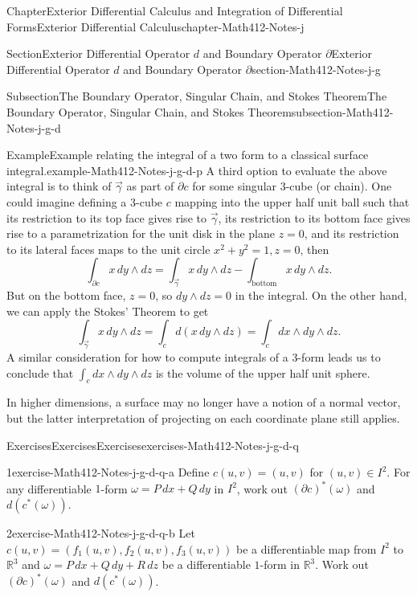 \documentclass[oneside,10pt,]{book}
\numberwithin{equation}{section}
\newcommand{\bbR}{\mathbb{R}}
\newcommand{\vg}{{\vec{\gamma}}}
\begin{document}
\begin{chapterptx}{Chapter}{Exterior Differential Calculus and Integration of Differential Forms}{}{Exterior Differential Calculus}{}{}{chapter-Math412-Notes-j}
\begin{sectionptx}{Section}{Exterior Differential Operator \(d\) and Boundary Operator \(\partial\)}{}{Exterior Differential Operator \(d\) and Boundary Operator \(\partial\)}{}{}{section-Math412-Notes-j-g}
\begin{subsectionptx}{Subsection}{The Boundary Operator, Singular Chain, and Stokes Theorem}{}{The Boundary Operator, Singular Chain, and Stokes Theorem}{}{}{subsection-Math412-Notes-j-g-d}
\begin{example}{Example}{Example relating the integral of a two form to a classical surface integral.}{example-Math412-Notes-j-g-d-p}
A third option to evaluate the above integral is to think of \(\vg\) as part of \(\partial c\) for some singular \(3\)-cube (or chain). One could imagine defining a \(3\)-cube \(c\) mapping into the upper half unit ball such that its restriction to its top face gives rise to \(\vg\), its restriction to its bottom face gives rise to a parametrization for the unit disk in the plane \(z=0\),  and its restriction to its lateral faces maps to the unit circle \(x^{2}+y^{2}=1, z=0\), then%
\begin{equation*}
\int_{\partial c} x \, dy\wedge dz= \int_{\vg}x\, dy\wedge dz - \int_{\text{bottom}} x\, dy\wedge dz.
\end{equation*}
But on the bottom face, \(z=0\), so \(dy\wedge dz=0\) in the integral. On the other hand, we can apply the Stokes' Theorem to get%
\begin{equation*}
\int_{\vg}x\, dy\wedge dz= \int_{c} d(x \, dy\wedge dz)= \int_{c} dx \wedge dy\wedge dz.
\end{equation*}
A similar consideration for how to compute integrals of a \(3\)-form leads us to conclude that \(\int_{c} dx \wedge dy\wedge dz\) is the volume of the upper half unit sphere.%
\par
In higher dimensions,  a surface may no longer have a notion of a normal vector, but the latter interpretation of projecting on each coordinate plane still applies.%
\end{example}
%
%
\typeout{************************************************}
\typeout{************************************************}
%
\begin{exercises-subsubsection-numberless}{Exercises}{Exercises}{}{Exercises}{}{}{exercises-Math412-Notes-j-g-d-q}
\begin{divisionexercise}{1}{}{}{exercise-Math412-Notes-j-g-d-q-a}%
Define \(c(u, v)=(u, v)\) for \((u,  v)\in I^{2}\). For any differentiable \(1\)-form \(\omega= P \, dx + Q\, dy\) in \(I^{2}\), work out \((\partial c)^{*}(\omega)\) and \(d \left( c^{*}(\omega) \right)\).%
\end{divisionexercise}%
\begin{divisionexercise}{2}{}{}{exercise-Math412-Notes-j-g-d-q-b}%
Let \(c(u, v)=(f_{1}(u, v), f_{2}(u, v), f_{3}(u, v))\) be a differentiable map from \(I^{2}\) to \(\bbR^{3}\) and \(\omega = P\, dx + Q\, dy + R\, dz\) be a differentiable \(1\)-form in \(\bbR^{3}\). Work out \((\partial c)^{*}(\omega)\) and \(d \left( c^{*}(\omega) \right)\).%

\end{divisionexercise}
\end{exercises-subsubsection-numberless}
\end{subsectionptx}
\end{sectionptx}
\end{chapterptx}
\end{document}
